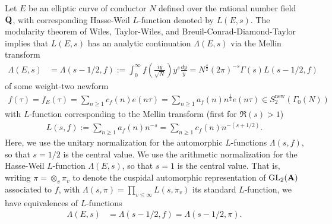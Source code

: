 \documentclass{amsart}
\theoremstyle{definition}
\begin{document}
Let $E$ be an elliptic curve of conductor $N$ defined over the rational number field ${\bf{Q}}$, 
with corresponding Hasse-Weil $L$-function denoted by $L(E, s)$.
The modularity theorem of Wiles, Taylor-Wiles, and Breuil-Conrad-Diamond-Taylor implies that 
$L(E, s)$ has an analytic continuation $\Lambda(E, s)$ via the Mellin transform 
\begin{align}\label{modularity-id} \Lambda (E, s) &= \Lambda(s-1/2, f) := \int_{0}^{\infty} f \left( \frac{iy}{\sqrt{N}} \right) y^s \frac{dy}{y} 
= N^{\frac{s}{2}} (2 \pi)^{-s} \Gamma(s) L(s-1/2, f) \end{align}
of some weight-two newform 
\begin{align*} f(\tau) = f_E(\tau) = \sum\limits_{n \geq 1} c_f(n) e(n \tau) = 
\sum\limits_{n \geq 1} a_f(n) n^{\frac{1}{2}} e(n \tau) \in S_2^{\operatorname{new}}(\Gamma_0(N)) \end{align*}
with $L$-function corresponding to the Mellin transform (first for $\Re(s) >1$)
\begin{align*} L(s, f) := \sum\limits_{n \geq 1} a_f(n) n^{-s} = \sum\limits_{n \geq 1} c_f(n) n^{-(s + 1/2)}. \end{align*}
Here, we use the unitary normalization for the automorphic $L$-functions $\Lambda(s, f)$, so that $s=1/2$ is the central value. 
We use the arithmetic normalization for the Hasse-Weil $L$-function $\Lambda(E,s)$, so that $s=1$ is the central value.
That is, writing $\pi = \otimes_v \pi_v$ to denote the cuspidal automorphic representation of $\operatorname{GL}_2({\bf{A}})$ associated to $f$,
with $\Lambda(s, \pi) = \prod_{v \leq \infty} L(s, \pi_v)$ its standard $L$-function, we have equivalences of $L$-functions 
\begin{align*} \Lambda(E, s) &= \Lambda(s -1/2, f) = \Lambda(s - 1/2, \pi). \end{align*}
\end{document}
